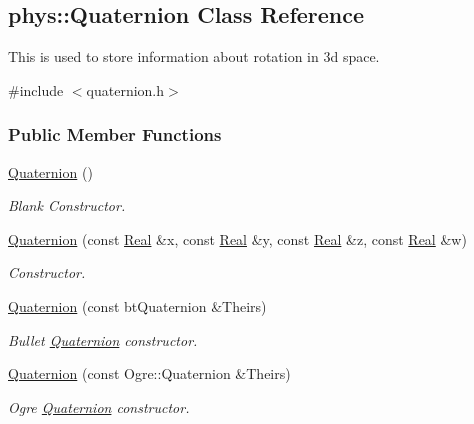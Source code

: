\hypertarget{classphys_1_1Quaternion}{
\subsection{phys::Quaternion Class Reference}
\label{df/d8c/classphys_1_1Quaternion}
}


This is used to store information about rotation in 3d space.  




{\ttfamily \#include $<$quaternion.h$>$}

\subsubsection*{Public Member Functions}
\begin{DoxyCompactItemize}
\item 
\hyperlink{classphys_1_1Quaternion_aca4ee6fd6d3967f06cc4a32361fa5a62}{Quaternion} ()
\begin{DoxyCompactList}\small\item\em Blank Constructor. \item\end{DoxyCompactList}\item 
\hyperlink{classphys_1_1Quaternion_ac8037875c08ce10c0195f3e6fd08b172}{Quaternion} (const \hyperlink{namespacephys_af7eb897198d265b8e868f45240230d5f}{Real} \&x, const \hyperlink{namespacephys_af7eb897198d265b8e868f45240230d5f}{Real} \&y, const \hyperlink{namespacephys_af7eb897198d265b8e868f45240230d5f}{Real} \&z, const \hyperlink{namespacephys_af7eb897198d265b8e868f45240230d5f}{Real} \&w)
\begin{DoxyCompactList}\small\item\em Constructor. \item\end{DoxyCompactList}\item 
\hyperlink{classphys_1_1Quaternion_ab9f13d19fe7d602d7c5feaed0aaf4620}{Quaternion} (const btQuaternion \&Theirs)
\begin{DoxyCompactList}\small\item\em Bullet \hyperlink{classphys_1_1Quaternion}{Quaternion} constructor. \item\end{DoxyCompactList}\item 
\hyperlink{classphys_1_1Quaternion_a4902c05489ebae03a55433d947c53d03}{Quaternion} (const Ogre::Quaternion \&Theirs)
\begin{DoxyCompactList}\small\item\em Ogre \hyperlink{classphys_1_1Quaternion}{Quaternion} constructor. \item\end{DoxyCompactList}\item 

\end{DoxyCompactItemize}
